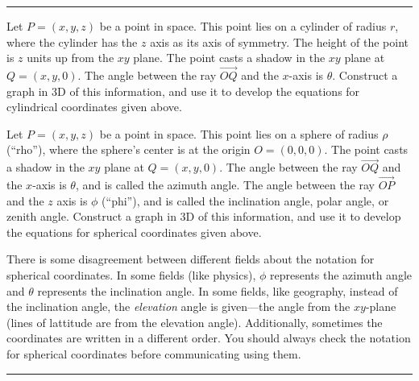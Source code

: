 \hrule
\vskip0.1in

\begin{problem} 
%
Let $P=(x,y,z)$ be a point in space. This point lies on a cylinder of radius $r$, where the cylinder has the $z$ axis as its axis of symmetry.  The height of the point is $z$ units up from the $xy$ plane. The point casts a shadow in the $xy$ plane at $Q=(x,y,0)$.  The angle between the ray $\vec{OQ}$ and the $x$-axis is $\theta$. Construct a graph in 3D of this information, and use it to develop the equations for cylindrical coordinates given above.
\end{problem}

\begin{problem}\label{derive spherical coordinates} Let 
% 
  $P=(x,y,z)$ be a point in space. This point lies on a sphere of
  radius $\rho$ (``rho''), where the sphere's center is at the origin
  $O=(0,0,0)$. The point casts a shadow in the $xy$ plane at
  $Q=(x,y,0)$.  The angle between the ray $\vec{OQ}$ and the $x$-axis
  is $\theta$, and is called the azimuth angle. The angle between
  the ray $\vec{OP}$ and the $z$ axis is $\phi$ (``phi''), and is
  called the inclination angle, polar angle, or zenith angle.  Construct
  a graph in 3D of this information, and use it to develop the
  equations for spherical coordinates given above.
\end{problem}

%
	
There is some disagreement between different fields about the notation
for spherical coordinates.  In some fields (like physics), $\phi$
represents the azimuth angle and $\theta$ represents the inclination
angle.  In some fields, like geography, instead of the inclination angle, the
\emph{elevation} angle is given---the angle from the $xy$-plane (lines
of lattitude are from the elevation angle).
Additionally, sometimes the coordinates are written in a different
order.  You should always check the notation for spherical coordinates
before communicating using them.
\vskip0.1in
\hrule
\vskip0.1in



